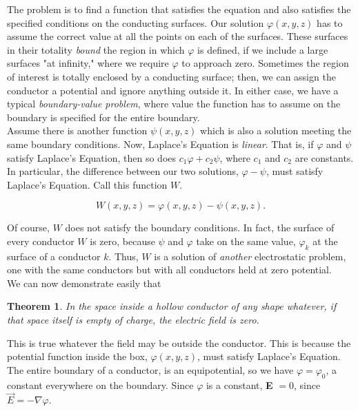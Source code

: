 \documentclass[svgnames]{article}
\newtheorem{theorem}{Theorem}		%
\begin{document}
The problem is to find a function that satisfies the equation and also
satisfies the specified conditions on the conducting surfaces. Our solution
$\varphi (x,y,z)$ has to assume the correct value at all the points on each of
the surfaces. These surfaces in their totality \textit{bound} the region in
which $\varphi$ is defined, if we include a large surfaces "at infinity," where
we require $\varphi$ to approach zero. Sometimes the region of interest is
totally enclosed by a conducting surface; then, we can assign the conductor
a potential and ignore anything outside it. In either case, we have a typical
\textit{boundary-value problem}, where value the function has to assume
on the boundary is specified for the entire boundary.\\

Assume there is another function $\psi(x,y,z)$ which is also a solution
meeting the same boundary conditions. Now, Laplace's Equation is
\textit{linear}. That is, if $\varphi$ and $\psi$ satisfy Laplace's
Equation, then so does $c_1\varphi + c_2\psi$, where $c_1$ and $c_2$ are
constants. In particular, the difference between our two solutions, $\varphi
- \psi$, must satisfy Laplace's Equation. Call this function $W$. 

\[
W(x,y,z) = \varphi(x,y,z) - \psi(x,y,z)
.\] 

Of course, $W$ does not satisfy the boundary conditions. In fact, the surface
of every conductor $W$ is zero, because $\psi$ and $\varphi$ take on the same
value, $\varphi_k$ at the surface of a conductor $k$. Thus, $W$ is a solution
of \textit{another} electrostatic problem, one with the same conductors but
with all conductors held at zero potential. \\

We can now demonstrate easily that 

\begin{theorem}
  In the space inside a hollow conductor of any shape whatever, if that space
  itself is empty of charge, the electric field is zero.
\end{theorem} 

This is true whatever the field may be outside the conductor. This is because
the potential function inside the box, $\varphi(x,y,z)$, must satisfy Laplace's
Equation. The entire boundary of a conductor, is an equipotential, so we have
$\varphi = \varphi_0$, a constant everywhere on the boundary. Since $\varphi$
is a constant, \textbf{E} $= 0$, since $\vec{E} = -\nabla \varphi$. 
\end{document}
